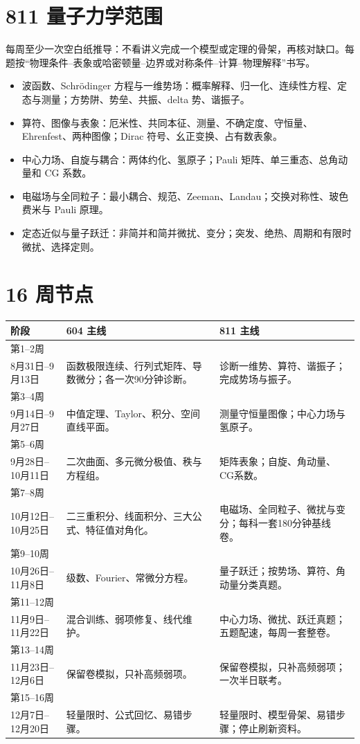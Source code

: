\documentclass[UTF8,a4paper]{ctexart}
\begin{document}
\section{811 量子力学范围}
每周至少一次空白纸推导：不看讲义完成一个模型或定理的骨架，再核对缺口。每题按“物理条件--表象或哈密顿量--边界或对称条件--计算--物理解释”书写。
\begin{itemize}
\item 波函数、Schrödinger 方程与一维势场：概率解释、归一化、连续性方程、定态与测量；方势阱、势垒、共振、delta 势、谐振子。
\item 算符、图像与表象：厄米性、共同本征、测量、不确定度、守恒量、Ehrenfest、两种图像；Dirac 符号、幺正变换、占有数表象。
\item 中心力场、自旋与耦合：两体约化、氢原子；Pauli 矩阵、单三重态、总角动量和 CG 系数。
\item 电磁场与全同粒子：最小耦合、规范、Zeeman、Landau；交换对称性、玻色费米与 Pauli 原理。
\item 定态近似与量子跃迁：非简并和简并微扰、变分；突发、绝热、周期和有限时微扰、选择定则。
\end{itemize}

\section{16 周节点}
\begin{longtable}{p{}p{}p{}}
\toprule 阶段 & 604 主线 & 811 主线\\\midrule
第1--2周\\8月31日--9月13日 & 函数极限连续、行列式矩阵、导数微分；各一次90分钟诊断。 & 诊断一维势、算符、谐振子；完成势场与振子。\\
第3--4周\\9月14日--9月27日 & 中值定理、Taylor、积分、空间直线平面。 & 测量守恒量图像；中心力场与氢原子。\\
第5--6周\\9月28日--10月11日 & 二次曲面、多元微分极值、秩与方程组。 & 矩阵表象；自旋、角动量、CG系数。\\
第7--8周\\10月12日--10月25日 & 二三重积分、线面积分、三大公式、特征值对角化。 & 电磁场、全同粒子、微扰与变分；每科一套180分钟基线卷。\\
第9--10周\\10月26日--11月8日 & 级数、Fourier、常微分方程。 & 量子跃迁；按势场、算符、角动量分类真题。\\
第11--12周\\11月9日--11月22日 & 混合训练、弱项修复、线代维护。 & 中心力场、微扰、跃迁真题；五题配速，每周一套整卷。\\
第13--14周\\11月23日--12月6日 & 保留卷模拟，只补高频弱项。 & 保留卷模拟，只补高频弱项；一次半日联考。\\
第15--16周\\12月7日--12月20日 & 轻量限时、公式回忆、易错步骤。 & 轻量限时、模型骨架、易错步骤；停止刷新资料。\\\bottomrule
\end{longtable}
\end{document}
